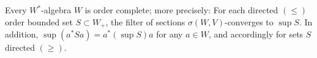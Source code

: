 Every $W^*$-algebra $W$ is order complete; more precisely: For each directed $(\leq)$ order bounded set $S \subset W_+$, the filter of sections $\sigma(W, V)$-converges to $\sup S$. In addition, $\sup(a^*Sa) = a^*(\sup S)a$ for any $a \in W$, and accordingly for sets $S$ directed $(\geq)$.
